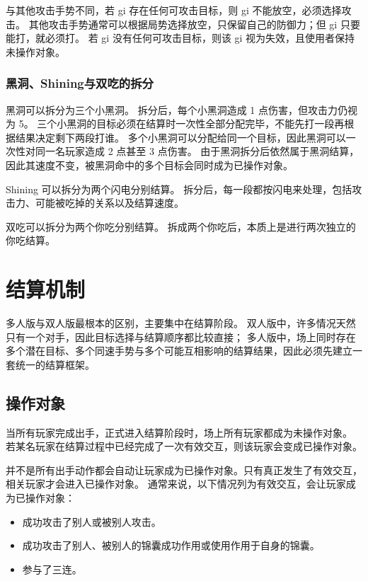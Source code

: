 \documentclass[12pt]{ctexart}
\begin{document}
与其他攻击手势不同，若 gi 存在任何可攻击目标，则 gi 不能放空，必须选择攻击。
其他攻击手势通常可以根据局势选择放空，只保留自己的防御力；但 gi 只要能打，就必须打。
若 gi 没有任何可攻击目标，则该 gi 视为失效，且使用者保持未操作对象。

\subsubsection{黑洞、Shining与双吃的拆分}

黑洞可以拆分为三个小黑洞。
拆分后，每个小黑洞造成 1 点伤害，但攻击力仍视为 5。
三个小黑洞的目标必须在结算时一次性全部分配完毕，不能先打一段再根据结果决定剩下两段打谁。
多个小黑洞可以分配给同一个目标，因此黑洞可以一次性对同一名玩家造成 2 点甚至 3 点伤害。
由于黑洞拆分后依然属于黑洞结算，因此其速度不变，被黑洞命中的多个目标会同时成为已操作对象。

Shining 可以拆分为两个闪电分别结算。
拆分后，每一段都按闪电来处理，包括攻击力、可能被吃掉的关系以及结算速度。

双吃可以拆分为两个你吃分别结算。
拆成两个你吃后，本质上是进行两次独立的你吃结算。

\section{结算机制}

多人版与双人版最根本的区别，主要集中在结算阶段。
双人版中，许多情况天然只有一个对手，因此目标选择与结算顺序都比较直接；
多人版中，场上同时存在多个潜在目标、多个同速手势与多个可能互相影响的结算结果，因此必须先建立一套统一的结算框架。

\subsection{操作对象}

当所有玩家完成出手，正式进入结算阶段时，场上所有玩家都成为未操作对象。
若某名玩家在结算过程中已经完成了一次有效交互，则该玩家会变成已操作对象。

并不是所有出手动作都会自动让玩家成为已操作对象。只有真正发生了有效交互，相关玩家才会进入已操作对象。
通常来说，以下情况列为有效交互，会让玩家成为已操作对象：

\begin{itemize}
    \item 成功攻击了别人或被别人攻击。
    \item 成功攻击了别人、被别人的锦囊成功作用或使用作用于自身的锦囊。
    \item 参与了三连。
\end{itemize}
\end{document}
